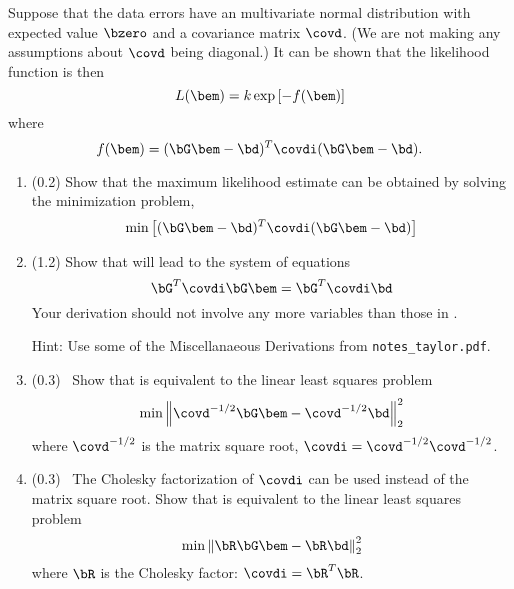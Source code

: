 \documentclass[11pt,titlepage,fleqn]{article}
\begin{document}
Suppose that the data errors have an multivariate normal distribution with expected value $\bzero$ and a covariance matrix $\covd$. (We are not making any assumptions about $\covd$ being diagonal.) It can be shown that the likelihood function is then
%
\begin{equation}
L(\bem) = k \exp \left[ -f(\bem) \right]
\end{equation}
%
where
%
\begin{equation}
f(\bem) = (\bG\bem - \bd)^T \covdi (\bG\bem - \bd).
\label{fm}
\end{equation}
%
\begin{enumerate}
\item (0.2) Show that the maximum likelihood estimate can be obtained by solving the minimization problem,
%
\begin{equation}
\min \left[ (\bG\bem - \bd)^T \covdi (\bG\bem - \bd) \right]
\label{min}
\end{equation}


\item (1.2) Show that  will lead to the system of equations
%
\begin{equation}
\bG^T \covdi \bG \bem = \bG^T \covdi \bd
\end{equation}
%
Your derivation should not involve any more variables than those in .

Hint: Use some of the Miscellanaeous Derivations from \verb+notes_taylor.pdf+.


\item (0.3) \ptag\ Show that  is equivalent to the linear least squares problem
%
\begin{equation}
\min\left\|  \covd^{-1/2}\bG\bem - \covd^{-1/2}\bd  \right\|_2^2
\end{equation}
%
where $\covd^{-1/2}$ is the matrix square root, \ie $\covdi = \covd^{-1/2} \covd^{-1/2}$.


\item (0.3) \ptag\ The Cholesky factorization of $\covdi$ can be used instead of the matrix square root. Show that  is equivalent to the linear least squares problem
%
\begin{equation}
\min\left\|  \bR\bG\bem - \bR\bd  \right\|_2^2
\end{equation}
%
where $\bR$ is the Cholesky factor: $\covdi = \bR^T\bR$.

\end{enumerate}
\end{document}
